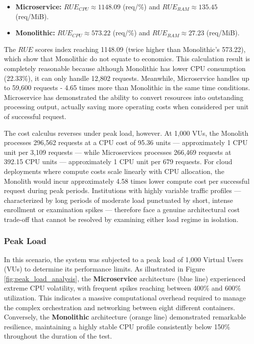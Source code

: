\begin{itemize}
    \item \textbf{Microservice:} $RUE_{CPU} \approx 1148.09$ (req/\%) and $RUE_{RAM} \approx 135.45$ (req/MiB).
    \item \textbf{Monolithic:} $RUE_{CPU} \approx 573.22$ (req/\%) and $RUE_{RAM} \approx 27.23$ (req/MiB).
\end{itemize}

The $RUE$ scores index reaching 1148.09 (twice higher than Monolithic's 573.22), which show that Monolithic do not equate to economics. 
This calculation result is completely reasonable because although Monolithic has lower CPU 
consumption (22.33\%), it can only handle 12,802 requests. Meanwhile, Microservice handles 
up to 59,600 requests - 4.65 times more than Monolithic in the same time conditions. Microservice has 
demonstrated the ability to convert resources into outstanding processing output, actually saving more operating costs when 
considered per unit of successful request.

The cost calculus reverses under peak load, however. At 1,000 VUs, the Monolith processes 296,562 requests at a CPU cost of 95.36 units — approximately 1 CPU unit per 3,109 requests — while Microservices processes 266,469 requests at 392.15 CPU units — approximately 1 CPU unit per 679 requests. For cloud deployments where compute costs scale linearly with CPU allocation, the Monolith would incur approximately 4.58 times lower compute cost per successful request during peak periods. Institutions with highly variable traffic profiles — characterized by long periods of moderate load punctuated by short, intense enrollment or examination spikes — therefore face a genuine architectural cost trade-off that cannot be resolved by examining either load regime in isolation.


\subsubsection{\textbf{Peak Load}}

In this scenario, the system was subjected to a peak load of 1,000 Virtual Users (VUs) to determine 
its performance limits. As illustrated in Figure \ref{fig:peak_load_analysis}, the \textbf{Microservice} 
architecture (blue line) experienced extreme CPU volatility, with frequent spikes reaching between 400\% and 600\% utilization. This indicates a massive computational overhead required to manage the complex orchestration and networking between eight different containers. Conversely, the \textbf{Monolithic} architecture (orange line) demonstrated remarkable resilience, maintaining a highly stable CPU profile consistently below 150\% throughout the duration of the test.

